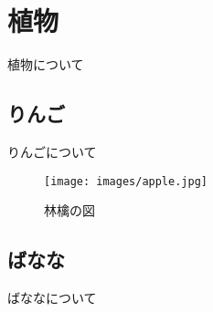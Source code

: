 \documentclass[10pt]{ujarticle}
\begin{document}
\section{植物}
植物について

\subsection{りんご}
りんごについて

\begin{figure}[H]
\centering
\texttt{[image: images/apple.jpg]}
\caption{林檎の図}
\end{figure}

\subsection{ばなな}
ばななについて
\end{document}
